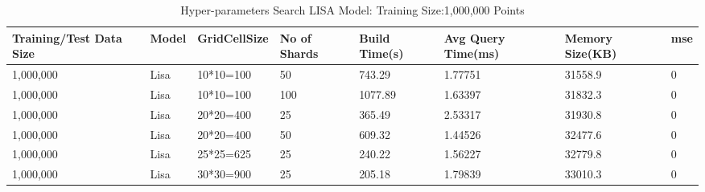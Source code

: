 \begin{table}
	\centering
\centering
	\begin{tabular}{||p{}<{\centering}|p{}<{\centering}|p{}<{\centering}| p{}<{\centering}|p{}<{\centering}|p{}<{\centering}|p{}<{\centering}|p{}<{\centering}||}
		\hline
		Training/Test Data Size& Model & GridCellSize & No of Shards& Build Time(s) & Avg Query Time(ms) & Memory Size(KB)&mse\\ [0.5ex] 
		\hline
		\hline
		1,000,000& Lisa& 10*10=100 & 50&743.29&1.77751 & 31558.9&0\\
		\hline
		1,000,000& Lisa& 10*10=100 & 100& 1077.89& 1.63397 & 31832.3&0\\
		\hline
		1,000,000& Lisa& 20*20=400 & 25& 365.49& 2.53317 & 31930.8&0\\
		\hline
		1,000,000& Lisa& 20*20=400 & 50& 609.32& 1.44526 & 32477.6&0\\
		\hline
		1,000,000& Lisa& 25*25=625 & 25& 240.22& 1.56227& 32779.8&0\\
		\hline
		1,000,000& Lisa& 30*30=900 & 25& 205.18& 1.79839 & 33010.3&0\\
		\hline
		\hline
	\end{tabular}
    \caption{Hyper-parameters Search LISA Model: Training Size:1,000,000 Points}
	\label{small_lognormal_lisa_1000000}
\end{table}


